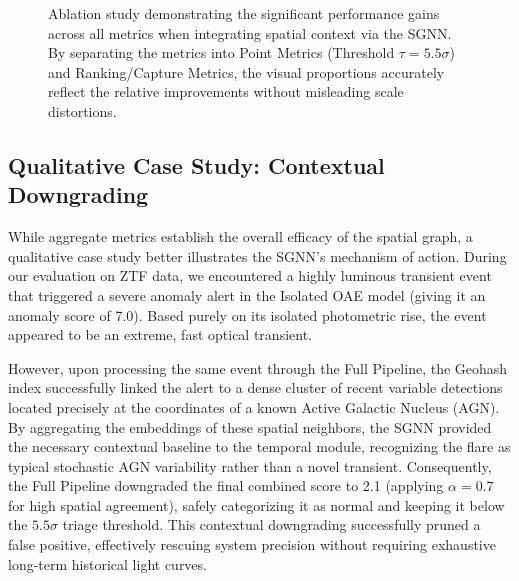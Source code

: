 \documentclass[10pt,journal,compsoc]{IEEEtran}
\begin{document}
\begin{figure}[htbp]
    \caption{Ablation study demonstrating the significant performance gains across all metrics when integrating spatial context via the SGNN. By separating the metrics into Point Metrics (Threshold $\tau=5.5\sigma$) and Ranking/Capture Metrics, the visual proportions accurately reflect the relative improvements without misleading scale distortions.}
    \label{fig:ablation}
\end{figure}

\subsection{Qualitative Case Study: Contextual Downgrading}
While aggregate metrics establish the overall efficacy of the spatial graph, a qualitative case study better illustrates the SGNN's mechanism of action. During our evaluation on ZTF data, we encountered a highly luminous transient event that triggered a severe anomaly alert in the Isolated OAE model (giving it an anomaly score of 7.0). Based purely on its isolated photometric rise, the event appeared to be an extreme, fast optical transient. 

However, upon processing the same event through the Full Pipeline, the Geohash index successfully linked the alert to a dense cluster of recent variable detections located precisely at the coordinates of a known Active Galactic Nucleus (AGN). By aggregating the embeddings of these spatial neighbors, the SGNN provided the necessary contextual baseline to the temporal module, recognizing the flare as typical stochastic AGN variability rather than a novel transient. Consequently, the Full Pipeline downgraded the final combined score to 2.1 (applying $\alpha=0.7$ for high spatial agreement), safely categorizing it as normal and keeping it below the $5.5\sigma$ triage threshold. This contextual downgrading successfully pruned a false positive, effectively rescuing system precision without requiring exhaustive long-term historical light curves.
\end{document}
